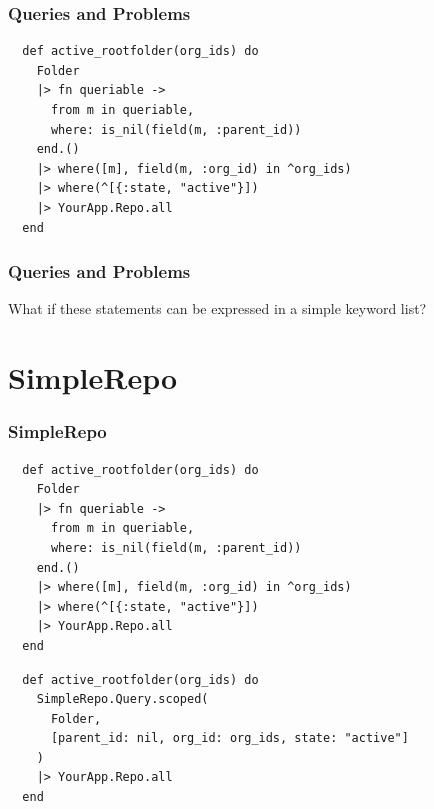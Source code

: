 \documentclass{beamer}
\begin{document}
\begin{frame}[fragile]
\frametitle{Queries and Problems}
\begin{verbatim}
  def active_rootfolder(org_ids) do
    Folder
    |> fn queriable ->
      from m in queriable,
      where: is_nil(field(m, :parent_id))
    end.()
    |> where([m], field(m, :org_id) in ^org_ids)
    |> where(^[{:state, "active"}])
    |> YourApp.Repo.all
  end
\end{verbatim}
\end{frame}


\begin{frame}[fragile]
\frametitle{Queries and Problems}
\centerline{What if these statements can be expressed in a simple keyword list?}
\end{frame}


\section{SimpleRepo} %

\begin{frame}[fragile]
\frametitle{SimpleRepo}
\begin{tiny}
\begin{verbatim}
  def active_rootfolder(org_ids) do
    Folder
    |> fn queriable ->
      from m in queriable,
      where: is_nil(field(m, :parent_id))
    end.()
    |> where([m], field(m, :org_id) in ^org_ids)
    |> where(^[{:state, "active"}])
    |> YourApp.Repo.all
  end
\end{verbatim}
\end{tiny}
\begin{verbatim}
  def active_rootfolder(org_ids) do
    SimpleRepo.Query.scoped(
      Folder,
      [parent_id: nil, org_id: org_ids, state: "active"]
    )
    |> YourApp.Repo.all
  end
\end{verbatim}
\end{frame}

\end{document}
